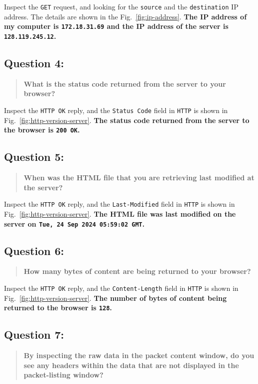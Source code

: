 \documentclass{cshwk}
\begin{document}
Inspect the \texttt{GET} request, and looking for the \texttt{source} and the \texttt{destination} IP address. The details are shown in the Fig.~\ref{fig:ip-address}. \textbf{The IP address of my computer is \texttt{172.18.31.69} and the IP address of the server is \texttt{128.119.245.12}.}

\subsection*{Question 4:}

\begin{quote}
    \textbf{What is the status code returned from the server to your browser?}
\end{quote}

Inspect the \texttt{HTTP OK} reply, and the \texttt{Status Code} field in \texttt{HTTP} is shown in Fig.~\ref{fig:http-version-server}. \textbf{The status code returned from the server to the browser is \texttt{200 OK}.}

\subsection*{Question 5:}

\begin{quote}
    \textbf{When was the HTML file that you are retrieving last modified at the server?}
\end{quote}

Inspect the \texttt{HTTP OK} reply, and the \texttt{Last-Modified} field in \texttt{HTTP} is shown in Fig.~\ref{fig:http-version-server}. \textbf{The HTML file was last modified on the server on \texttt{Tue, 24 Sep 2024 05:59:02 GMT}.}


\subsection*{Question 6:}
\begin{quote}
    \textbf{How many bytes of content are being returned to your browser?}
\end{quote}

Inspect the \texttt{HTTP OK} reply, and the \texttt{Content-Length} field in \texttt{HTTP} is shown in Fig.~\ref{fig:http-version-server}. \textbf{The number of bytes of content being returned to the browser is \texttt{128}.}

\subsection*{Question 7:}
\begin{quote}
    \textbf{By inspecting the raw data in the packet content window, do you see any headers within the data that are not displayed in the packet-listing window?}
\end{quote}
\end{document}
